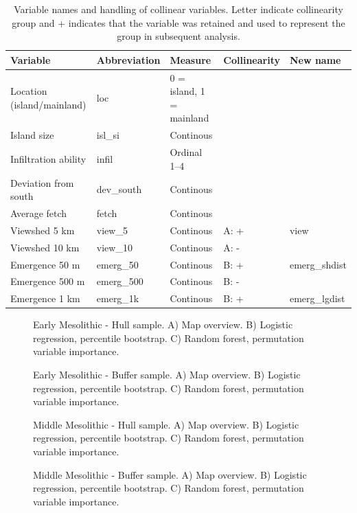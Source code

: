 \documentclass[12pt, a4paper]{article}
\begin{document}
\begin{table}
	\hskip-2.0cm\begin{tabular}{ | l | l | l | l | l |}
		\hline
		Variable & Abbreviation & Measure & Collinearity & New name \\ \hline
		Location (island/mainland) & loc & 0 = island, 1 = mainland &&  \\ \hline
		Island size & isl\_si & Continous && \\ \hline
		Infiltration ability & infil & Ordinal 1--4 &&\\ \hline
		Deviation from south & dev\_south & Continous &&\\ \hline
		Average fetch & fetch &  Continous &&\\ \hline
		Viewshed 5 km &  view\_5  & Continous & A: + & view \\ \hline
		Viewshed 10 km &  view\_10  & Continous & A: - &\\ \hline
		Emergence 50 m  & emerg\_50 & Continous & B: + & emerg\_shdist \\ \hline
		Emergence 500 m & emerg\_500 & Continous & B: - &  \\ \hline
		Emergence 1 km & emerg\_1k & Continous & B: + & emerg\_lgdist \\ \hline
		\hline
	\end{tabular}
	\caption[Variable names and handling of collinear variables.]{Variable names and handling of collinear variables. Letter indicate collinearity group and + indicates that the variable was retained and used to represent the group in subsequent analysis.}
	\label{table:var}
\end{table}

\begin{figure}
	\caption[Early Mesolithic - Hull sample]{Early Mesolithic - Hull sample. A) Map overview. B) Logistic regression, percentile bootstrap. C) Random forest, permutation variable importance.}
	\label{fig:em_hull}
\bigbreak
	\caption[Early Mesolithic - Buffer sample]{Early Mesolithic - Buffer sample. A) Map overview. B) Logistic regression, percentile bootstrap. C) Random forest, permutation variable importance.}
	\label{fig:em_buff}
\end{figure}

\begin{figure}
	\caption[Middle Mesolithic - Hull sample]{Middle Mesolithic - Hull sample. A) Map overview. B) Logistic regression, percentile bootstrap. C) Random forest, permutation variable importance.}
	\label{fig:mm_hull}
\bigbreak
	\caption[Middle Mesolithic - Buffer sample]{Middle Mesolithic - Buffer sample. A) Map overview. B) Logistic regression, percentile bootstrap. C) Random forest, permutation variable importance.}
	\label{fig:mm_buff}
\end{figure}
	
\end{document}
